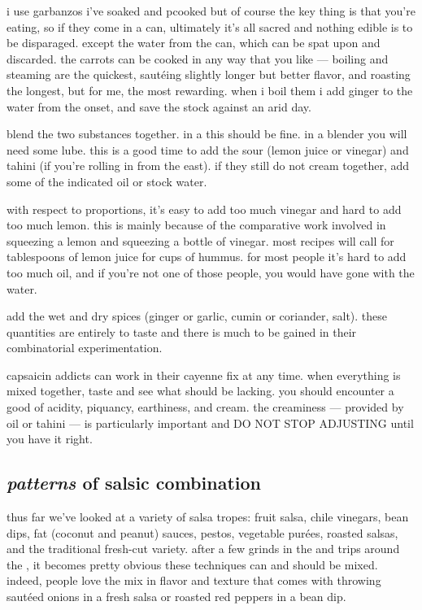 i use garbanzos i've soaked and pcooked but of course the key thing is
that you're eating, so if they come in a can, ultimately it's all
sacred and nothing edible is to be disparaged. except the water from
the can, which can be spat upon and discarded. the carrots can be
cooked in any way that you like --- boiling and steaming are the
quickest, saut\'{e}ing slightly longer but better flavor, and roasting
the longest, but for me, the most rewarding. when i boil them i add
ginger to the water from the onset, and save the stock against an arid
day.

blend the two substances together. in a  this should be fine. in
a blender you will need some lube. this is a good time to add the sour
(lemon juice or vinegar) and tahini (if you're rolling in from the
east). if they still do not cream together, add some of the indicated
oil or stock water.

with respect to proportions, it's easy to add too much vinegar and
hard to add too much lemon. this is mainly because of the comparative
work involved in squeezing a lemon and squeezing a bottle of
vinegar. most recipes will call for  tablespoons of lemon juice
for  cups of hummus. for most people it's hard to add too much
oil, and if you're not one of those people, you would have gone with
the water.

add the wet and dry spices (ginger or garlic, cumin or coriander,
salt). these quantities are entirely to taste and there is much to be
gained in their combinatorial experimentation.

capsaicin addicts can work in their cayenne fix at any time. when
everything is mixed together, taste and see what should be
lacking. you should encounter a good  of acidity, piquancy,
earthiness, and cream. the creaminess --- provided by oil or tahini
--- is particularly important and DO NOT STOP ADJUSTING until you have
it right.

\subsection{\textit{patterns} of salsic combination}

thus far we've looked at a variety of salsa tropes: fruit salsa, chile
vinegars, bean dips, fat (coconut and peanut) sauces, pestos,
vegetable pur\'{e}es, roasted salsas, and the traditional fresh-cut
variety. after a few grinds in the  and trips around the ,
it becomes pretty obvious these techniques can and should be
mixed. indeed, people love the mix in flavor and texture that comes
with throwing saut\'{e}ed onions in a fresh salsa or roasted red
peppers in a bean dip.

